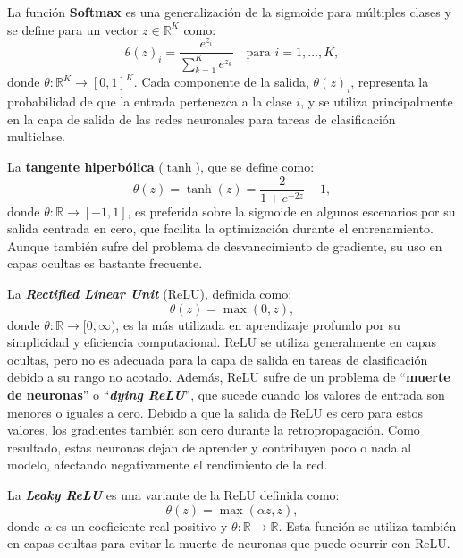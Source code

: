 La función \textbf{Softmax} es una generalización de la sigmoide para múltiples
clases y se define para un vector $z \in \mathbb{R}^{K}$ como:
\begin{equation}
	\theta(z)_{i} = \frac{e^{z_i}}{\sum_{k=1}^{K} e^{z_k}}\quad \text{para }i = 1,
	\ldots, K,
\end{equation}
donde $\theta : \mathbb{R}^{K} \to [0,1]^{K}$. Cada componente de la salida, $\theta
(z)_{i}$, representa la probabilidad de que la entrada pertenezca a la clase $i$,
y se utiliza principalmente en la capa de salida de las redes neuronales para tareas
de clasificación multiclase.

La \textbf{tangente hiperbólica} ($\tanh$), que se define como:
\begin{equation}
	\theta(z) = \tanh(z) = \frac{2}{1 + e^{-2z}}- 1,
\end{equation}
donde $\theta : \mathbb{R}\to [-1,1]$, es preferida sobre la sigmoide en algunos
escenarios por su salida centrada en cero, que facilita la optimización durante
el entrenamiento. Aunque también sufre del problema de desvanecimiento de gradiente,
su uso en capas ocultas es bastante frecuente.

La \textbf{\textit{Rectified Linear Unit}} (ReLU), definida como:
\begin{equation}
	\theta(z) = \max(0, z),
\end{equation}
donde $\theta : \mathbb{R}\to [0, \infty)$, es la más utilizada en aprendizaje
profundo por su simplicidad y eficiencia computacional. ReLU se utiliza generalmente
en capas ocultas, pero no es adecuada para la capa de salida en tareas de
clasificación debido a su rango no acotado. Además, ReLU sufre de un problema de
\enquote{\textbf{muerte de neuronas}} o \enquote{\textbf{\textit{dying ReLU}}}, que
sucede cuando los valores de entrada son menores o iguales a cero. Debido a que
la salida de ReLU es cero para estos valores, los gradientes también son cero durante
la retropropagación. Como resultado, estas neuronas dejan de aprender y contribuyen
poco o nada al modelo, afectando negativamente el rendimiento de la red.

La \textbf{\textit{Leaky ReLU}} es una variante de la ReLU definida como:
\begin{equation}
	\theta(z) = \max(\alpha z, z),
\end{equation}
donde $\alpha$ es un coeficiente real positivo y
$\theta : \mathbb{R}\to \mathbb{R}$. Esta función se utiliza también en capas ocultas
para evitar la muerte de neuronas que puede ocurrir con ReLU.

